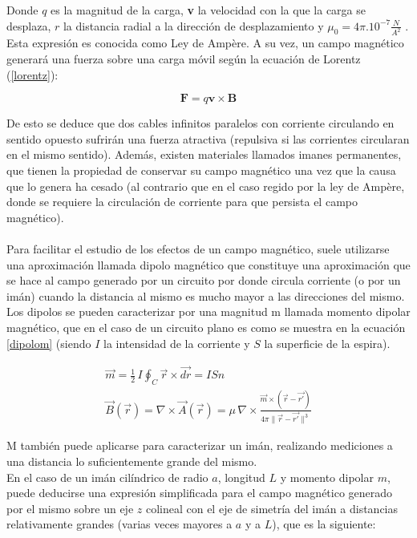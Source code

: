 \documentclass[12pt]{article}
\begin{document}
Donde $q$ es la magnitud de la carga, \textbf{v} la velocidad con la que la carga se desplaza, $r$ la distancia radial a la dirección de desplazamiento y $\mu_0=4\pi.10^{-7}\frac{N}{A^2}$ . Esta expresión es conocida como Ley de Ampère. A su vez, un campo magnético generará una fuerza sobre una carga móvil según la ecuación de Lorentz (\ref{lorentz}):

\begin{equation}
    \textbf{F}=q\textbf{v}\times\textbf{B}
    \label{lorentz}
\end{equation}

De esto se deduce que dos cables infinitos paralelos con corriente circulando en sentido opuesto sufrirán una fuerza atractiva (repulsiva si las corrientes circularan en el mismo sentido).
Además, existen materiales llamados imanes permanentes, que tienen la propiedad de conservar su campo magnético una vez que la causa que lo genera ha cesado (al contrario que en el caso regido por la ley de Ampère, donde se requiere la circulación de corriente para que persista el campo magnético).\\
\\
Para facilitar el estudio de los efectos de un campo magnético, suele utilizarse una aproximación llamada dipolo magnético que constituye una aproximación que se hace al campo generado por un circuito por donde circula corriente (o por un imán) cuando la distancia al mismo es mucho mayor a las direcciones del mismo. Los dipolos se pueden caracterizar por una magnitud m llamada momento dipolar magnético, que en el caso de un circuito plano es como se muestra en la ecuación \ref{dipolom} (siendo $I$ la intensidad de la corriente y $S$ la superficie de la espira).


\begin{align}
    \vec{m}=\frac{1}{2}\,I\oint_C \vec{r}\times\vec{dr}=IS\hat{n} 
    \label{dipolom}\\
    \vec{B}(\vec{r})=\nabla\times\vec{A}(\vec{r})=\mu\,\nabla\times\frac{\vec{m}\times(\vec{r}-\vec{r'})}{4\pi\|\vec{r}-\vec{r'}\|^3}
\end{align}

M también puede aplicarse para caracterizar un imán, realizando mediciones a una distancia lo suficientemente grande del mismo.\\

En el caso de un imán cilíndrico de radio $a$,  longitud $L$ y momento dipolar $m$, puede deducirse una expresión simplificada para el campo magnético generado por el mismo sobre un eje $z$ colineal con el eje de simetría del imán a distancias relativamente grandes (varias veces mayores a $a$ y a $L$), que es la siguiente:
\end{document}
